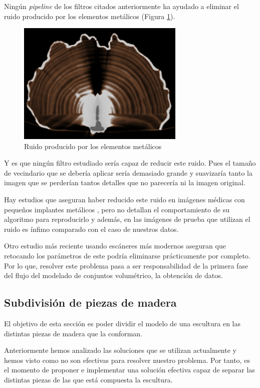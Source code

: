 Ningún \textit{pipeline} de los filtros citados anteriormente ha ayudado a eliminar el ruido producido por los elementos metálicos (Figura \ref{fig:desarrollo/ruido-clavo}).

\begin{figure}[H]
	\centering
	\includegraphics[width=8cm]{imagenes/desarrollo/ruido-clavo}
	\caption{Ruido producido por los elementos metálicos}
	\label{fig:desarrollo/ruido-clavo}
\end{figure}

Y es que ningún filtro estudiado sería capaz de reducir este ruido. Pues el tamaño de vecindario que se debería aplicar sería demasiado grande y suavizaría tanto la imagen que se perderían tantos detalles que no parecería ni la imagen original.

Hay estudios que aseguran haber reducido este ruido en imágenes médicas con pequeños implantes metálicos \cite{deman98} \cite{watzke04}, pero no detallan el comportamiento de su algoritmo para reproducirlo y además, en las imágenes de prueba que utilizan el ruido es ínfimo comparado con el caso de nuestros datos.

Otro estudio más reciente \cite{boas12} usando escáneres más modernos aseguran que retocando los parámetros de este podría eliminarse prácticamente por completo. Por lo que, resolver este problema pasa a ser responsabilidad de la primera fase del flujo del modelado de conjuntos volumétrico, la obtención de datos.

\subsection{Subdivisión de piezas de madera}

El objetivo de esta sección es poder dividir el modelo de una escultura en las distintas piezas de madera que la conforman.

Anteriormente hemos analizado las soluciones que se utilizan actualmente y hemos visto como no son efectivas para resolver nuestro problema. Por tanto, es el momento de proponer e implementar una solución efectiva capaz de separar las distintas piezas de las que está compuesta la escultura.

